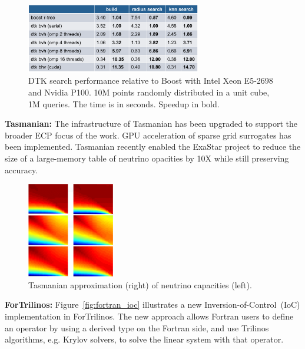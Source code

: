 \begin{figure}[htb]
        \centering
        \includegraphics[width=3.0in]{projects/2.3.3-MathLibs/2.3.3.14-ALExa-ForTrilinos/dtk-gpu}
        \caption{\label{fig:dtk-gpu}DTK search performance relative to Boost with Intel Xeon E5-2698 and Nvidia P100. 10M points randomly distributed in a unit cube, 1M queries. The time is in seconds. Speedup in bold.}
\end{figure}

{\bf Tasmanian:} The infrastructure of Tasmanian has been upgraded to support
the broader ECP focus of the work.  GPU acceleration of sparse grid surrogates
has been implemented.  Tasmanian recently enabled the ExaStar project to
reduce the size of a large-memory table of neutrino opacities by 10X while
still preserving accuracy.

\begin{figure}[htb]
        \centering
        \includegraphics[width=1.5in]{projects/2.3.3-MathLibs/2.3.3.14-ALExa-ForTrilinos/tasmanian-gpu}
        \caption{\label{fig:tasmanian-gpu}Tasmanian approximation (right) of neutrino capacities (left).}
\end{figure}

{\bf ForTrilinos:}
Figure~\ref{fig:fortran_ioc} illustrates a new Inversion-of-Control~(IoC)
implementation in ForTrilinos. The new approach allows Fortran users to define
an operator by using a derived type on the Fortran side, and use Trilinos
algorithms, e.g. Krylov solvers, to solve the linear system with that operator.

